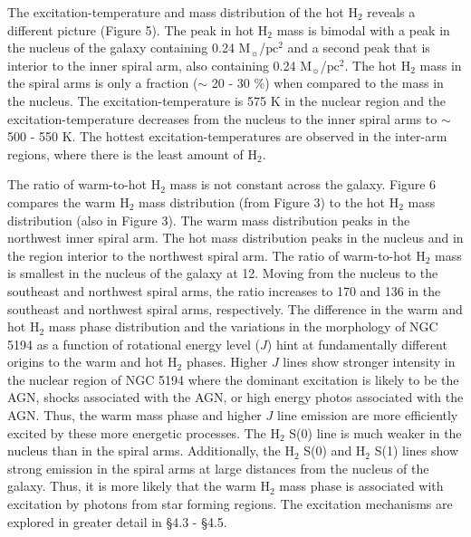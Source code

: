 \documentclass[manuscript]{aastex}
\begin{document}
The excitation-temperature and mass distribution of the hot $\mathrm{H_2}$ reveals a different picture (Figure 5).  The peak in hot $\mathrm{H_2}$ mass is bimodal with a peak in the nucleus of the galaxy containing 0.24 $\mathrm{M_\sun}$/$\mathrm{pc^2}$ and a second peak that is interior to the inner spiral arm, also containing 0.24 $\mathrm{M_\sun}$/$\mathrm{pc^2}$.  The hot $\mathrm{H_2}$ mass in the spiral arms is only a fraction ($\sim$ 20 - 30 \%) when compared to the mass in the nucleus.  The excitation-temperature is 575 K in the nuclear region and the excitation-temperature decreases from the nucleus to the inner spiral arms to $\sim$ 500 - 550 K.  The hottest excitation-temperatures are observed in the inter-arm regions, where there is the least amount of $\mathrm{H_2}$.

The ratio of warm-to-hot $\mathrm{H_2}$ mass is not constant across the galaxy.  Figure 6 compares the warm $\mathrm{H_2}$ mass distribution (from Figure 3) to the hot $\mathrm{H_2}$ mass distribution (also in Figure 3).  The warm mass distribution peaks in the northwest inner spiral arm.  The hot mass distribution peaks in the nucleus and in the region interior to the northwest spiral arm.  The ratio of warm-to-hot $\mathrm{H_2}$ mass is smallest in the nucleus of the galaxy at 12.  Moving from the nucleus to the southeast and northwest spiral arms, the ratio increases to 170 and 136 in the southeast and northwest spiral arms, respectively.  The difference in the warm and hot $\mathrm{H_2}$ mass phase distribution and the variations in the morphology of NGC 5194 as a  function of rotational energy level ($J$) hint at fundamentally different origins to the warm and hot $\mathrm{H_2}$ phases.  Higher $J$ lines show stronger intensity in the nuclear region of NGC 5194 where the dominant excitation is likely to be the AGN, shocks associated with the AGN, or high energy photos associated with the AGN.  Thus, the warm mass phase and higher $J$ line emission are more efficiently excited by these more energetic processes.  The $\mathrm{H_2}$ S(0) line is much weaker in the nucleus than in the spiral arms.  Additionally, the $\mathrm{H_2}$ S(0) and $\mathrm{H_2}$ S(1) lines show strong emission in the spiral arms at large distances from the nucleus of the galaxy.  Thus, it is more likely that the warm $\mathrm{H_2}$ mass phase is associated with excitation by photons from star forming regions.  The excitation mechanisms are explored in greater detail in \S4.3 - \S4.5. 
\end{document}
